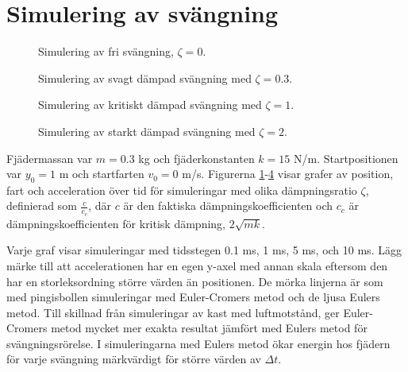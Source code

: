 \documentclass[12pt, a4paper]{article}
\begin{document}
\section{Simulering av svängning}
\begin{figure}[p]
    \centering
    \caption{Simulering av fri svängning, $\zeta=0$.}
    
    \label{fig:oscillation_0_0}
\end{figure}
\begin{figure}[p]
    \centering
    \caption{Simulering av svagt dämpad svängning med $\zeta=0.3$.}
    
    \label{fig:oscillation_0_3}
\end{figure}
\begin{figure}[p]
    \centering
    \caption{Simulering av kritiskt dämpad svängning med $\zeta=1$.}
    
    \label{fig:oscillation_1_0}
\end{figure}
\begin{figure}[p]
    \centering
    \caption{Simulering av starkt dämpad svängning med $\zeta=2$.}
    
    \label{fig:oscillation_2_0}
\end{figure}

Fjädermassan var $m=0.3$ kg och fjäderkonstanten $k=15$ N/m. Startpositionen var $y_0=1$ m och startfarten $v_0=0$ m/s. Figurerna \ref{fig:oscillation_0_0}-\ref{fig:oscillation_2_0} visar grafer av position, fart och acceleration över tid för simuleringar med olika dämpningsratio $\zeta$, definierad som $\frac{c}{c_c}$, där $c$ är den faktiska dämpningskoefficienten och $c_c$ är dämpningskoefficienten för kritisk dämpning, $2\sqrt{mk}$.

Varje graf visar simuleringar med tidsstegen 0.1 ms, 1 ms, 5 ms, och 10 ms. Lägg märke till att accelerationen har en egen y-axel med annan skala eftersom den har en storleksordning större värden än positionen. De mörka linjerna är som med pingisbollen simuleringar med Euler-Cromers metod och de ljusa Eulers metod. Till skillnad från simuleringar av kast med luftmotstånd, ger Euler-Cromers metod mycket mer exakta resultat jämfört med Eulers metod för svängningsrörelse. I simuleringarna med Eulers metod ökar energin hos fjädern för varje svängning märkvärdigt för större värden av $\Delta t$.

\clearpage
\printbibliography
\end{document}
